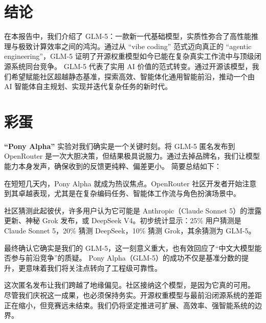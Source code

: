 \section{结论}

在本报告中，我们介绍了 GLM-5：一款新一代基础模型，实质性弥合了高性能推理与极致计算效率之间的鸿沟。通过从 ``vibe coding'' 范式迈向真正的 ``agentic engineering''，GLM-5 证明了开源权重模型如今已能在复杂真实工作流中与顶级闭源系统同台竞争。
GLM-5 代表了实用 AI 价值的范式转变。通过开源该模型，我们希望赋能社区超越静态基准，探索高效、智能体化通用智能前沿，推动一个由 AI 智能体自主规划、实现并迭代复杂任务的新时代。


\section{彩蛋}
\textbf{``Pony Alpha''} 实验对我们确实是一个关键时刻。将 GLM-5 匿名发布到 OpenRouter 是一次大胆决策，但结果极具说服力。通过去掉品牌名，我们让模型能力本身发声，确保收到的反馈更纯粹、偏差更小。
简要总结如下：


在短短几天内，Pony Alpha 就成为热议焦点。OpenRouter 社区开发者开始注意到其卓越表现，尤其是在复杂编码任务、智能体工作流与角色扮演场景中。

社区猜测此起彼伏，许多用户认为它可能是 Anthropic（Claude Sonnet 5）的泄露更新、神秘 Grok 发布，或 DeepSeek V4。初步统计显示：25\% 用户猜测是 Claude Sonnet 5，20\% 猜测 DeepSeek，10\% 猜测 Grok，其余猜测为 GLM-5。

最终确认它确实是我们的 GLM-5，这一刻意义重大，也有效回应了“中文大模型能否参与前沿竞争”的质疑。
%
Pony Alpha（GLM-5）的成功不仅是基准分数的提升，更意味着我们将关注点转向了工程级可靠性。

这次匿名发布让我们跨越了地缘偏见。社区接纳这个模型，是因为它真的可用。
%
尽管我们庆祝这一成果，也必须保持务实。开源权重模型与最前沿闭源系统的差距正在缩小，但竞赛远未结束。我们仍将坚定推进可扩展、高效率、强智能系统的边界。
